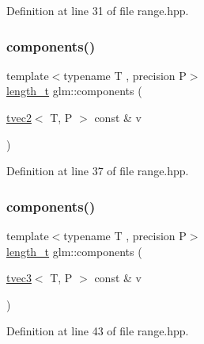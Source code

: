 Definition at line 31 of file range.\+hpp.

\mbox{\label{group__gtx__range_gaa47e3ca3e374b418523be2898497e20f}} 
\subsubsection{\texorpdfstring{components()}{components()}\hspace{0.1cm}{\footnotesize\ttfamily [2/5]}}
{\footnotesize\ttfamily template$<$typename T , precision P$>$ \\
\mbox{\hyperlink{namespaceglm_a090a0de2260835bee80e71a702492ed9}{length\+\_\+t}} glm\+::components (\begin{DoxyParamCaption}\item[{\mbox{\hyperlink{structglm_1_1tvec2}{tvec2}}$<$ T, P $>$ const \&}]{v }\end{DoxyParamCaption})\hspace{0.3cm}{\ttfamily [inline]}}



Definition at line 37 of file range.\+hpp.

\mbox{\label{group__gtx__range_gad1cb57e1fdaf433442f8fcb1811d02bc}} 
\subsubsection{\texorpdfstring{components()}{components()}\hspace{0.1cm}{\footnotesize\ttfamily [3/5]}}
{\footnotesize\ttfamily template$<$typename T , precision P$>$ \\
\mbox{\hyperlink{namespaceglm_a090a0de2260835bee80e71a702492ed9}{length\+\_\+t}} glm\+::components (\begin{DoxyParamCaption}\item[{\mbox{\hyperlink{structglm_1_1tvec3}{tvec3}}$<$ T, P $>$ const \&}]{v }\end{DoxyParamCaption})\hspace{0.3cm}{\ttfamily [inline]}}



Definition at line 43 of file range.\+hpp.

